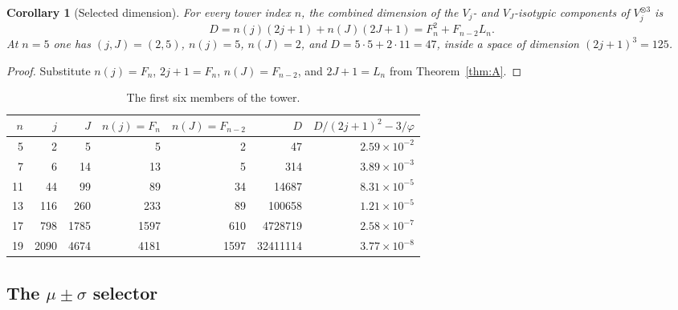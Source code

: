 \documentclass[11pt]{amsart}
\newtheorem{corollary}[lemma]{Corollary}
\theoremstyle{definition}
\theoremstyle{remark}
\begin{document}
\begin{corollary}[Selected dimension]\label{cor:D}
For every tower index $n$, the combined dimension of the $V_j$- and $V_J$-isotypic components of $V_j^{\otimes 3}$ is
\[
D=n(j)(2j+1)+n(J)(2J+1)=F_n^2+F_{n-2}L_n.
\]
At $n=5$ one has $(j,J)=(2,5)$, $n(j)=5$, $n(J)=2$, and $D=5\cdot5+2\cdot11=47$, inside a space of dimension $(2j+1)^3=125$.
\end{corollary}
\begin{proof}
Substitute $n(j)=F_n$, $2j+1=F_n$, $n(J)=F_{n-2}$, and $2J+1=L_n$ from Theorem~\ref{thm:A}.
\end{proof}

\begin{table}[h]
\centering
\begin{tabular}{rrrrrrr}
\toprule
$n$ & $j$ & $J$ & $n(j)=F_n$ & $n(J)=F_{n-2}$ & $D$ & $D/(2j+1)^2-3/\varphi$\\
\midrule
5 & 2 & 5 & 5 & 2 & 47 & $2.59\times10^{-2}$\\
7 & 6 & 14 & 13 & 5 & 314 & $3.89\times10^{-3}$\\
11 & 44 & 99 & 89 & 34 & 14687 & $8.31\times10^{-5}$\\
13 & 116 & 260 & 233 & 89 & 100658 & $1.21\times10^{-5}$\\
17 & 798 & 1785 & 1597 & 610 & 4728719 & $2.58\times10^{-7}$\\
19 & 2090 & 4674 & 4181 & 1597 & 32411114 & $3.77\times10^{-8}$\\
\bottomrule
\end{tabular}
\caption{The first six members of the tower.}\label{tab:tower}
\end{table}

\subsection{The \texorpdfstring{$\mu\pm\sigma$}{mu +/- sigma} selector}
\end{document}
